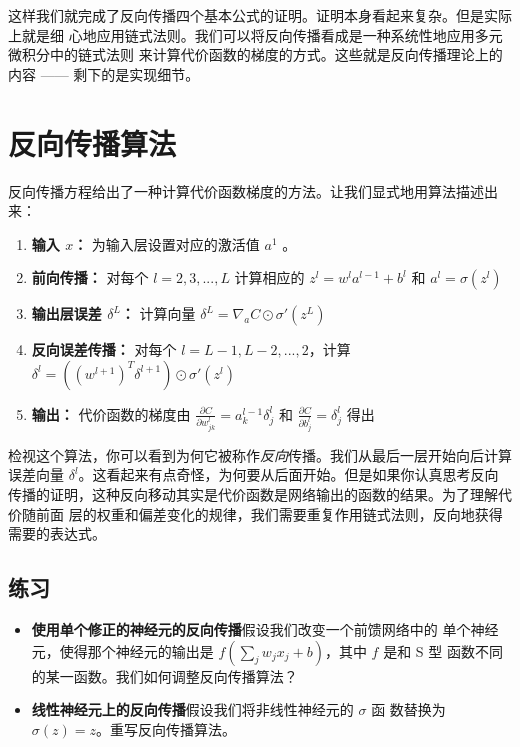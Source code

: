 这样我们就完成了反向传播四个基本公式的证明。证明本身看起来复杂。但是实际上就是细
心地应用链式法则。我们可以将反向传播看成是一种系统性地应用多元微积分中的链式法则
来计算代价函数的梯度的方式。这些就是反向传播理论上的内容 —— 剩下的是实现细节。

\section{反向传播算法}
\label{sec:the_backpropagation_algorithm}

反向传播方程给出了一种计算代价函数梯度的方法。让我们显式地用算法描述出来：

\begin{enumerate}
\item \textbf{输入 $x$：} 为输入层设置对应的激活值 $a^{1}$ 。
\item \textbf{前向传播：} 对每个 $l=2,3,...,L$ 计算相应的 $z^l = w^la^{l-1} +
  b^l$ 和 $a^l = \sigma(z^l)$
\item \textbf{输出层误差 $\delta^L$：} 计算向量 $\delta^L = \nabla_a C \odot
  \sigma'(z^L)$
\item \textbf{反向误差传播：} 对每个 $l=L-1, L-2,...,2$，计算
  $\delta^l = ((w^{l+1})^T\delta^{l+1})\odot \sigma'(z^l)$
\item \textbf{输出：} 代价函数的梯度由 $\frac{\partial C}{\partial w^l_{jk}} = a^{l-1}_k \delta^l_j$ 和 $\frac{\partial C}{\partial b_j^l} = \delta_j^l$ 得出
\end{enumerate}

检视这个算法，你可以看到为何它被称作\emph{反向}传播。我们从最后一层开始向后计算
误差向量 $\delta^l$。这看起来有点奇怪，为何要从后面开始。但是如果你认真思考反向
传播的证明，这种反向移动其实是代价函数是网络输出的函数的结果。为了理解代价随前面
层的权重和偏差变化的规律，我们需要重复作用链式法则，反向地获得需要的表达式。

\subsection*{练习}

\begin{itemize}
\item \textbf{使用单个修正的神经元的反向传播}\quad 假设我们改变一个前馈网络中的
  单个神经元，使得那个神经元的输出是 $f(\sum_j w_jx_j + b)$，其中 $f$ 是和 S 型
  函数不同的某一函数。我们如何调整反向传播算法？
\item \textbf{线性神经元上的反向传播}\quad 假设我们将非线性神经元的 $\sigma$ 函
  数替换为 $\sigma(z) = z$。重写反向传播算法。
\end{itemize}

